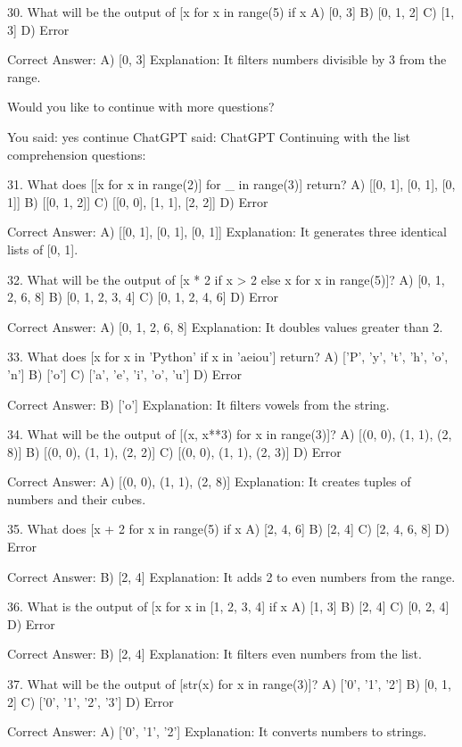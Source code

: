30. What will be the output of [x for x in range(5) if x %
A) [0, 3]
B) [0, 1, 2]
C) [1, 3]
D) Error

Correct Answer: A) [0, 3]
Explanation: It filters numbers divisible by 3 from the range.

Would you like to continue with more questions?






You said:
yes continue
ChatGPT said:
ChatGPT
Continuing with the list comprehension questions:

31. What does [[x for x in range(2)] for _ in range(3)] return?
A) [[0, 1], [0, 1], [0, 1]]
B) [[0, 1, 2]]
C) [[0, 0], [1, 1], [2, 2]]
D) Error

Correct Answer: A) [[0, 1], [0, 1], [0, 1]]
Explanation: It generates three identical lists of [0, 1].

32. What will be the output of [x * 2 if x > 2 else x for x in range(5)]?
A) [0, 1, 2, 6, 8]
B) [0, 1, 2, 3, 4]
C) [0, 1, 2, 4, 6]
D) Error

Correct Answer: A) [0, 1, 2, 6, 8]
Explanation: It doubles values greater than 2.

33. What does [x for x in 'Python' if x in 'aeiou'] return?
A) ['P', 'y', 't', 'h', 'o', 'n']
B) ['o']
C) ['a', 'e', 'i', 'o', 'u']
D) Error

Correct Answer: B) ['o']
Explanation: It filters vowels from the string.

34. What will be the output of [(x, x**3) for x in range(3)]?
A) [(0, 0), (1, 1), (2, 8)]
B) [(0, 0), (1, 1), (2, 2)]
C) [(0, 0), (1, 1), (2, 3)]
D) Error

Correct Answer: A) [(0, 0), (1, 1), (2, 8)]
Explanation: It creates tuples of numbers and their cubes.

35. What does [x + 2 for x in range(5) if x %
A) [2, 4, 6]
B) [2, 4]
C) [2, 4, 6, 8]
D) Error

Correct Answer: B) [2, 4]
Explanation: It adds 2 to even numbers from the range.

36. What is the output of [x for x in [1, 2, 3, 4] if x %
A) [1, 3]
B) [2, 4]
C) [0, 2, 4]
D) Error

Correct Answer: B) [2, 4]
Explanation: It filters even numbers from the list.

37. What will be the output of [str(x) for x in range(3)]?
A) ['0', '1', '2']
B) [0, 1, 2]
C) ['0', '1', '2', '3']
D) Error

Correct Answer: A) ['0', '1', '2']
Explanation: It converts numbers to strings.

